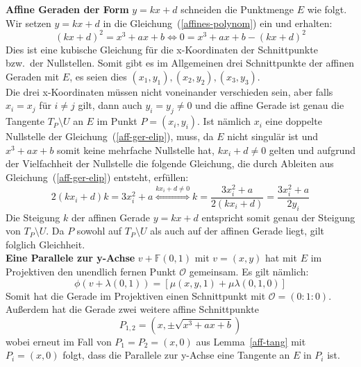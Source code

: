 \documentclass[hidelinks]{article}
\theoremstyle{plain}
\theoremstyle{definition}
\theoremstyle{rem}
\newcommand{\patinf}{\mathcal{O}}
\begin{document}
\begin{sloppypar}
\textbf{Affine Geraden der Form} $y=kx+d$ schneiden die Punktmenge $E$ wie folgt. Wir setzen $y=kx+d$ in die Gleichung~(\ref{affines-polynom}) ein und erhalten:
\begin{equation}\label{aff-ger-elip}
    (kx+d)^2=x^3+ax+b\Leftrightarrow 0=x^3+ax+b-(kx+d)^2
\end{equation}
Dies ist eine kubische Gleichung für die x-Koordinaten der Schnittpunkte bzw.\ der Nullstellen. Somit gibt es im Allgemeinen drei Schnittpunkte der affinen Geraden mit $E$, es seien dies $(x_1,y_1),(x_2,y_2),(x_3,y_3)$.\\
Die drei x-Koordinaten müssen nicht voneinander verschieden sein, aber falls $x_i=x_j$ für $i\ne j$ gilt, dann auch $y_i=y_j\ne 0$ und die affine Gerade ist genau die Tangente $T_P\setminus U$ an $E$ im Punkt $P=(x_i,y_i)$.
Ist nämlich $x_i$ eine doppelte Nullstelle der Gleichung~(\ref{aff-ger-elip}), muss, da $E$ nicht singulär ist und $x^3+ax+b$ somit keine mehrfache Nullstelle hat, $kx_i+d\ne 0$ gelten und aufgrund der Vielfachheit der Nullstelle die folgende Gleichung, die durch Ableiten aus Gleichung~(\ref{aff-ger-elip}) entsteht, erfüllen:
\begin{equation*}
    2(kx_i+d)k=3x_i^2+a \stackrel{kx_i+d\ne0}{\Leftrightarrow}k=\frac{3x_i^2+a}{2(kx_i+d)}=\frac{3x_i^2+a}{2y_i}
\end{equation*}
Die Steigung $k$ der affinen Gerade $y=kx+d$ entspricht somit genau der Steigung von $T_P\setminus U$. Da $P$ sowohl auf $T_P\setminus U$ als auch auf der affinen Gerade liegt, gilt folglich Gleichheit.\\

\textbf{Eine Parallele zur y-Achse} $v+\mathbb{F}(0,1)$ mit $v=(x,y)$ hat mit $E$ im Projektiven den unendlich fernen Punkt $\patinf$ gemeinsam. Es gilt nämlich:
\begin{equation*}
    \phi(v+\lambda(0,1))=[\mu(x,y,1)+\mu\lambda(0,1,0)]
\end{equation*}
Somit hat die Gerade im Projektiven einen Schnittpunkt mit $\patinf=(0:1:0)$.\\
Außerdem hat die Gerade zwei weitere affine Schnittpunkte
\begin{equation*} 
    P_{1,2}=(x,\pm \sqrt{x^3+ax+b})
\end{equation*}
wobei erneut im Fall von $P_1=P_2=(x,0)$ aus Lemma~\ref{aff-tang} mit $P_i=(x,0)$ folgt, dass die Parallele zur y-Achse eine Tangente an $E$ in $P_i$ ist.


\end{sloppypar}
\end{document}
